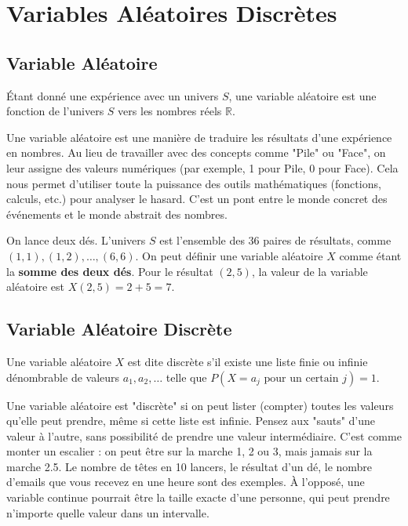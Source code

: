 \newpage
\section{Variables Aléatoires Discrètes}

\subsection{Variable Aléatoire}

\begin{definitionbox}
Étant donné une expérience avec un univers $S$, une variable aléatoire est une fonction de l'univers $S$ vers les nombres réels $\mathbb{R}$.
\end{definitionbox}

\begin{intuitionbox}
Une variable aléatoire est une manière de traduire les résultats d'une expérience en nombres. Au lieu de travailler avec des concepts comme "Pile" ou "Face", on leur assigne des valeurs numériques (par exemple, 1 pour Pile, 0 pour Face). Cela nous permet d'utiliser toute la puissance des outils mathématiques (fonctions, calculs, etc.) pour analyser le hasard. C'est un pont entre le monde concret des événements et le monde abstrait des nombres.
\end{intuitionbox}

\begin{examplebox}
On lance deux dés. L'univers $S$ est l'ensemble des 36 paires de résultats, comme $(1,1), (1,2), \dots, (6,6)$. On peut définir une variable aléatoire $X$ comme étant la \textbf{somme des deux dés}.
Pour le résultat $(2, 5)$, la valeur de la variable aléatoire est $X(2, 5) = 2 + 5 = 7$.
\end{examplebox}

\subsection{Variable Aléatoire Discrète}

\begin{definitionbox}
Une variable aléatoire $X$ est dite discrète s'il existe une liste finie ou infinie dénombrable de valeurs $a_1, a_2, \dots$ telle que $P(X=a_j \text{ pour un certain } j) = 1$.
\end{definitionbox}

\begin{intuitionbox}
Une variable aléatoire est "discrète" si on peut lister (compter) toutes les valeurs qu'elle peut prendre, même si cette liste est infinie. Pensez aux "sauts" d'une valeur à l'autre, sans possibilité de prendre une valeur intermédiaire. C'est comme monter un escalier : on peut être sur la marche 1, 2 ou 3, mais jamais sur la marche 2.5. Le nombre de têtes en 10 lancers, le résultat d'un dé, le nombre d'emails que vous recevez en une heure sont des exemples. À l'opposé, une variable continue pourrait être la taille exacte d'une personne, qui peut prendre n'importe quelle valeur dans un intervalle.
\end{intuitionbox}

